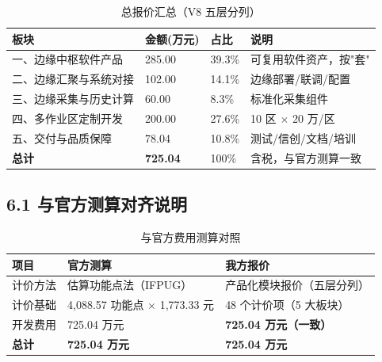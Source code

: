 \documentclass[11pt,a4paper]{ctexart}
\begin{document}
\begin{table}[H]\centering
\caption{总报价汇总（V8 五层分列）}
\begin{tabular}{p{6.2cm} p{2.2cm} p{2.5cm} p{2.6cm}}
\toprule
\textbf{板块} & \textbf{金额(万元)} & \textbf{占比} & \textbf{说明} \\
\midrule
一、边缘中枢软件产品 & 285.00 & 39.3\% & 可复用软件资产，按"套" \\
二、边缘汇聚与系统对接 & 102.00 & 14.1\% & 边缘部署/联调/配置 \\
三、边缘采集与历史计算 & 60.00 & 8.3\% & 标准化采集组件 \\
四、多作业区定制开发 & 200.00 & 27.6\% & 10 区 $\times$ 20 万/区 \\
五、交付与品质保障 & 78.04 & 10.8\% & 测试/信创/文档/培训 \\
\midrule
\textbf{总计} & \textbf{725.04} & 100\% & 含税，与官方测算一致 \\
\bottomrule
\end{tabular}
\end{table}

\subsection{6.1 与官方测算对齐说明}

\begin{table}[H]\centering
\caption{与官方费用测算对照}
\begin{tabular}{p{3.2cm} p{5.2cm} p{5.2cm}}
\toprule
\textbf{项目} & \textbf{官方测算} & \textbf{我方报价} \\
\midrule
计价方法 & 估算功能点法（IFPUG） & 产品化模块报价（五层分列） \\
计价基础 & 4,088.57 功能点 $\times$ 1,773.33 元 & 48 个计价项（5 大板块） \\
开发费用 & 725.04 万元 & \textbf{725.04 万元（一致）} \\
\textbf{总计} & \textbf{725.04 万元} & \textbf{725.04 万元} \\
\bottomrule
\end{tabular}
\end{table}
\end{document}
